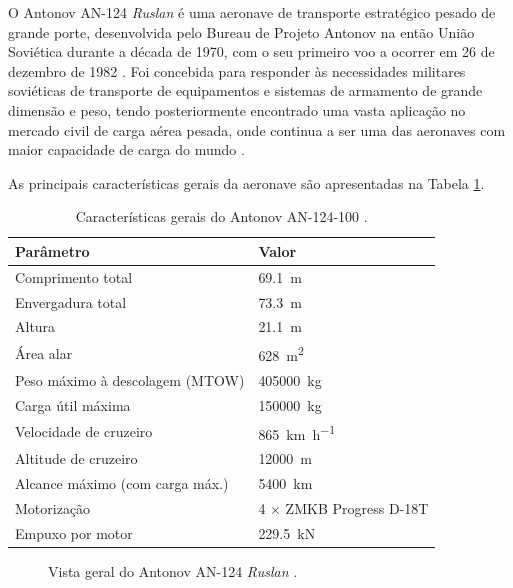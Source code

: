\documentclass[11pt,twoside,a4paper]{report}
\begin{document}
O Antonov AN-124 \textit{Ruslan} é uma aeronave de transporte estratégico pesado de grande porte, desenvolvida pelo Bureau de Projeto Antonov na então União Soviética durante a década de 1970, com o seu primeiro voo a ocorrer em 26 de dezembro de 1982 \cite{Gordon2008}. Foi concebida para responder às necessidades militares soviéticas de transporte de equipamentos e sistemas de armamento de grande dimensão e peso, tendo posteriormente encontrado uma vasta aplicação no mercado civil de carga aérea pesada, onde continua a ser uma das aeronaves com maior capacidade de carga do mundo \cite{GarciaFernandez2025}.

As principais características gerais da aeronave são apresentadas na Tabela \ref{tab:an124_specs}.

\begin{table}[h!]
\centering
\caption{Características gerais do Antonov AN-124-100 
\cite{Gordon2008, GarciaFernandez2025}.}
\label{tab:an124_specs}
\renewcommand{\arraystretch}{1.4}
\begin{tabularx}{\textwidth}{p{5.5cm} X}
\toprule
\textbf{Parâmetro} & \textbf{Valor} \\
\midrule
Comprimento total & \SI{69.1}{\meter} \\
Envergadura total & \SI{73.3}{\meter} \\
Altura & \SI{21.1}{\meter} \\
Área alar & \SI{628}{\meter\squared} \\
Peso máximo à descolagem (MTOW) & \SI{405000}{\kilo\gram} \\
Carga útil máxima & \SI{150000}{\kilo\gram} \\
Velocidade de cruzeiro & \SI{865}{\kilo\meter\per\hour} \\
Altitude de cruzeiro & \SI{12000}{\meter} \\
Alcance máximo (com carga máx.) & \SI{5400}{\kilo\meter} \\
Motorização & 4 $\times$ ZMKB Progress D-18T \\
Empuxo por motor & \SI{229.5}{\kilo\newton} \\
\bottomrule
\end{tabularx}
\end{table}

\begin{figure}[h!]
    \centering
    \caption{Vista geral do Antonov AN-124 \textit{Ruslan} 
    \cite{Gordon2008}.}
    \label{fig:an124_geral}
\end{figure}
\end{document}
